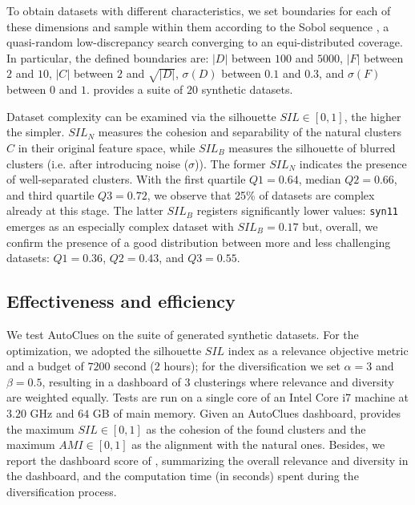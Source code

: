 To obtain datasets with different characteristics, we set boundaries for each of these dimensions and sample within them according to the Sobol sequence \cite{sobol1967distribution}, a quasi-random low-discrepancy search converging to an equi-distributed coverage. 
In particular, the defined boundaries are: $|D|$ between $100$ and $5000$, $|F|$ between $2$ and $10$, $|C|$ between $2$ and $\sqrt{|D|}$, $\sigma(D)$ between $0.1$ and $0.3$, and $\sigma(F)$ between $0$ and $1$.
 provides a suite of $20$ synthetic datasets. 

Dataset complexity can be examined via the silhouette $SIL \in [0, 1]$, the higher the simpler. 
$SIL_N$ measures the cohesion and separability of the natural clusters $C$ in their original feature space, while  $SIL_B$ measures the silhouette of blurred clusters (i.e. after introducing noise ($\sigma$)).
The former $SIL_N$ indicates the presence of well-separated clusters.
With the first quartile $Q1=0.64$, median $Q2=0.66$, and third quartile $Q3=0.72$, we observe that 25\% of datasets are complex already at this stage. 
The latter $SIL_B$ registers significantly lower values: \texttt{syn11} emerges as an especially complex dataset with $SIL_B=0.17$ but, overall, we confirm the presence of a good distribution between more and less challenging datasets: $Q1 = 0.36$, $Q2 = 0.43$, and $Q3 = 0.55$.

\vspace{-0.2cm}
\subsection{Effectiveness and efficiency}
\label{clustering-ssec:effectiveness}


We test AutoClues on the suite of generated synthetic datasets.
For the optimization, we adopted the silhouette $SIL$ index as a relevance objective metric and a budget of $7200$ second ($2$ hours); for the diversification we set $\alpha=3$ and $\beta=0.5$, resulting in a dashboard of $3$ clusterings where relevance and diversity are weighted equally.
Tests are run on a single core of an Intel Core i7 machine at $3.20$ GHz and $64$ GB of main memory.
%
Given an AutoClues dashboard,  provides
the maximum $SIL\in [0, 1]$ as the cohesion of the found clusters and the maximum $AMI \in [0, 1]$ as the alignment with the natural ones. Besides, we report the dashboard score of , summarizing the overall relevance and diversity in the dashboard, and the computation time (in seconds) spent during the diversification process. 

